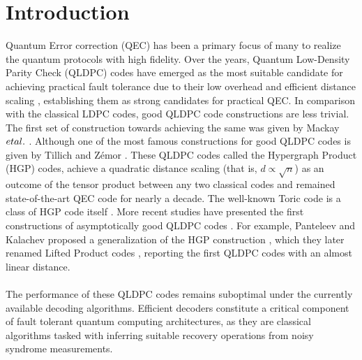 \documentclass[%
 reprint,
 amsmath,amssymb,
 aps,
pra,
showkeys,
]{revtex4-2}
\begin{document}
\maketitle


\section{\label{sec:introduction}Introduction}
Quantum Error correction (QEC) has been a primary focus of many to realize the quantum protocols with high fidelity.
Over the years, Quantum Low-Density Parity Check (QLDPC) codes have emerged as the most suitable candidate for achieving practical fault tolerance due to their low overhead \cite{gottesman2013fault} and efficient distance scaling \cite{panteleev2021quantum,tillich2013quantum}, establishing them as strong candidates for practical QEC.
In comparison with the classical LDPC codes, good QLDPC code constructions are less trivial.
The first set of construction towards achieving the same was given by Mackay $\emph{et al.}$ \cite{mackay2004sparse}.
Although one of the most famous constructions for good QLDPC codes is given by Tillich and Z{\'e}mor \cite{tillich2013quantum}.
These QLDPC codes called the Hypergraph Product (HGP) codes, achieve a quadratic distance scaling (that is, $d \propto \sqrt{n}$) as an outcome of the tensor product between any two classical codes and remained state-of-the-art QEC code for nearly a decade.
The well-known Toric code is a class of HGP code itself \cite{kitaev2003fault}.
More recent studies have presented the first constructions of asymptotically good QLDPC codes \cite{panteleev2022asymptotically,leverrier2022quantum}. 
For example, Panteleev and Kalachev proposed a generalization of the HGP construction \cite{panteleev2021degenerate}, which they later renamed Lifted Product codes \cite{panteleev2021quantum}, reporting the first QLDPC codes with an almost linear distance.\\\\ 
The performance of these QLDPC codes remains suboptimal under the currently available decoding algorithms.
Efficient decoders constitute a critical component of fault tolerant quantum computing architectures, as they are classical algorithms tasked with inferring suitable recovery operations from noisy syndrome measurements.
\end{document}
